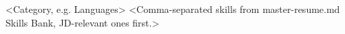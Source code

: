 
\begin{cvskills}

  \cvskill
    {<Category, e.g. Languages>}
    {<Comma-separated skills from master-resume.md Skills Bank, JD-relevant ones first.>}

\end{cvskills}
